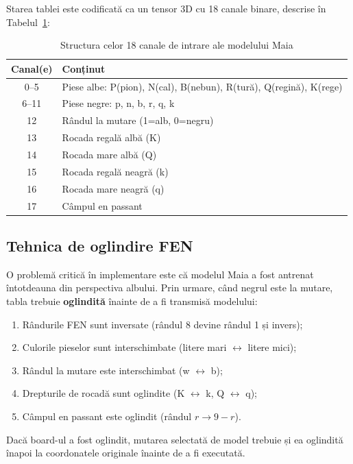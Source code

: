 \documentclass[12pt, a4paper, twoside]{report}
\numberwithin{equation}{section}
\begin{document}
Starea tablei este codificată ca un tensor 3D cu 18 canale binare,
descrise în Tabelul~\ref{tab:maia_channels}:

\begin{table}[H]
\centering
\caption{Structura celor 18 canale de intrare ale modelului Maia}
\label{tab:maia_channels}
\begin{tabular}{cl}
\toprule
\textbf{Canal(e)} & \textbf{Conținut} \\
\midrule
0–5 & Piese albe: P(pion), N(cal), B(nebun), R(tură), Q(regină), K(rege) \\
6–11 & Piese negre: p, n, b, r, q, k \\
12 & Rândul la mutare (1=alb, 0=negru) \\
13 & Rocada regală albă (K) \\
14 & Rocada mare albă (Q) \\
15 & Rocada regală neagră (k) \\
16 & Rocada mare neagră (q) \\
17 & Câmpul en passant \\
\bottomrule
\end{tabular}
\end{table}

\subsection{Tehnica de oglindire FEN}

O problemă critică în implementare este că modelul Maia a fost antrenat întotdeauna
din perspectiva albului. Prin urmare, când negrul este la mutare, tabla trebuie
\textbf{oglindită} înainte de a fi transmisă modelului:

\begin{enumerate}
  \item Rândurile FEN sunt inversate (rândul 8 devine rândul 1 și invers);
  \item Culorile pieselor sunt interschimbate (litere mari $\leftrightarrow$ litere mici);
  \item Rândul la mutare este interschimbat (w $\leftrightarrow$ b);
  \item Drepturile de rocadă sunt oglindite (K $\leftrightarrow$ k, Q $\leftrightarrow$ q);
  \item Câmpul en passant este oglindit (rândul $r \rightarrow 9-r$).
\end{enumerate}

Dacă board-ul a fost oglindit, mutarea selectată de model trebuie și ea oglindită
înapoi la coordonatele originale înainte de a fi executată.
\end{document}
